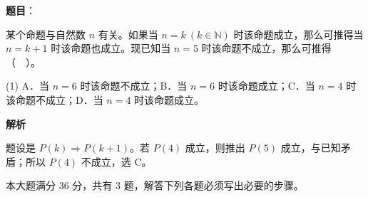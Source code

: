 \begin{answer}

\textbf{题目}：

某个命题与自然数 $n$ 有关。如果当 $n=k\ (k\in\mathbb N)$ 时该命题成立，那么可推得当 $n=k+1$ 时该命题也成立。现已知当 $n=5$ 时该命题不成立，那么可推得（　）。

\begin{gkopts}(1)
\task A．当 $n=6$ 时该命题不成立；B．当 $n=6$ 时该命题成立；C．当 $n=4$ 时该命题不成立；D．当 $n=4$ 时该命题成立。
\end{gkopts}

\textbf{解析}

题设是 $P(k)\Rightarrow P(k+1)$。若 $P(4)$ 成立，则推出 $P(5)$ 成立，与已知矛盾；所以 $P(4)$ 不成立，选 C。


\end{answer}

本大题满分 36 分，共有 3 题，解答下列各题必须写出必要的步骤。

